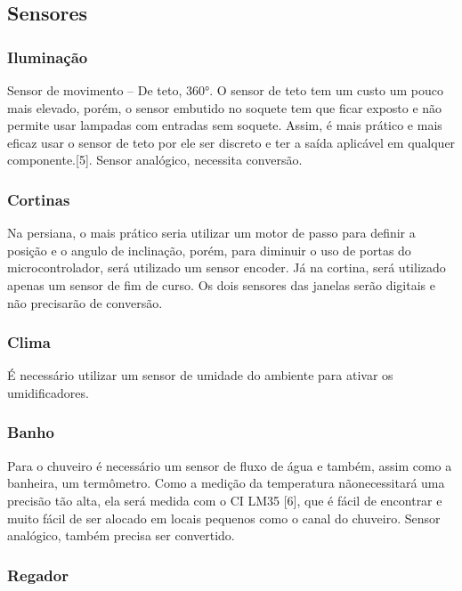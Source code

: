 \subsection{Sensores}

\subsubsection{Iluminação}

	Sensor de movimento – De teto, 360°. O sensor de teto tem um custo um pouco mais elevado, porém, o sensor embutido no soquete tem que ficar exposto e não permite usar lampadas com entradas sem soquete. Assim, é mais prático e mais eficaz usar o sensor de teto por ele ser discreto e ter a saída aplicável em qualquer componente.[5]. Sensor analógico, necessita conversão.

\subsubsection{Cortinas}

	Na persiana, o mais prático seria utilizar um motor de passo para definir a posição e o angulo de inclinação, porém, para diminuir o uso de portas do microcontrolador, será utilizado um sensor encoder. Já na cortina, será utilizado apenas um sensor de fim de curso. Os dois sensores das janelas serão digitais e não precisarão de conversão.

\subsubsection{Clima}

	É necessário utilizar um sensor de umidade do ambiente para ativar os umidificadores.

\subsubsection{Banho}

	Para o chuveiro é necessário um sensor de fluxo de água e também, assim como a banheira, um termômetro. Como a medição da temperatura nãonecessitará uma precisão tão alta, ela será  medida com o CI LM35 [6], que é fácil de encontrar e muito fácil de ser alocado em locais pequenos como o canal do chuveiro. Sensor analógico, também precisa ser convertido.

\subsubsection{Regador}

